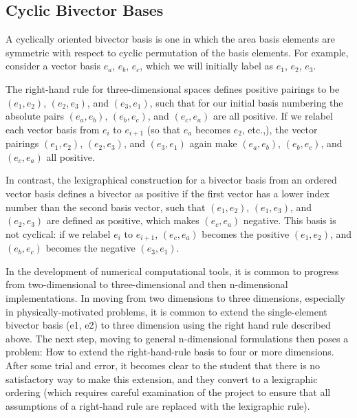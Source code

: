 \documentclass[11pt]{article}
\newcommand{\bv}[1][]{e_{#1}}
\newcommand{\bp}[2]{(#1,#2)}
\begin{document}
\subsection{Cyclic Bivector Bases}
\label{sec:cyclicbivector}


A cyclically oriented bivector basis is one in which the area basis elements are symmetric with respect to cyclic permutation of the basis elements. For example, consider a vector basis $\bv[a]$, $\bv[b]$, $\bv[c]$, which we will initially label as $\bv[1]$, $\bv[2]$, $\bv[3]$. 


The right-hand rule for three-dimensional spaces defines positive pairings to be $\bp{\bv[1]}{\bv[2]}$, $\bp{\bv[2]}{\bv[3]}$, and $\bp{\bv[3]}{\bv[1]}$, such that for our initial basis numbering the absolute pairs $\bp{\bv[a]}{\bv[b]}$, $\bp{\bv[b]}{\bv[c]}$, and $\bp{\bv[c]}{\bv[a]}$ are all positive. If we relabel each vector basis from $\bv[i]$ to $\bv[i+1]$ (so that $\bv[a]$ becomes $\bv[2]$, etc.,), the vector pairings $\bp{\bv[1]}{\bv[2]}$, $\bp{\bv[2]}{\bv[3]}$, and $\bp{\bv[3]}{\bv[1]}$ again make $\bp{\bv[a]}{\bv[b]}$, $\bp{\bv[b]}{\bv[c]}$, and $\bp{\bv[c]}{\bv[a]}$ all positive.



In contrast, the lexigraphical construction for a bivector basis from an ordered vector basis defines a bivector as positive if the first vector has a lower index number than the second basis vector, such that $\bp{\bv[1]}{\bv[2]}$, $\bp{\bv[1]}{\bv[3]}$, and $\bp{\bv[2]}{\bv[3]}$ are defined as positive, which makes $\bp{\bv[c]}{\bv[a]}$ negative. This basis is not cyclical: if we relabel $\bv[i]$ to $\bv[i+1]$, $\bp{\bv[c]}{\bv[a]}$ becomes the positive $\bp{\bv[1]}{\bv[2]}$, and $\bp{\bv[b]}{\bv[c]}$ becomes the negative $\bp{\bv[3]}{\bv[1]}$.




In the development of numerical computational tools, it is common to progress from two-dimensional to three-dimensional and then n-dimensional implementations. In moving from two dimensions to three dimensions, especially in physically-motivated problems, it is common to extend the single-element bivector basis (e1, e2) to three dimension using the right hand rule described above. The next step, moving to general n-dimensional formulations then poses a problem: How to extend the right-hand-rule basis to four or more dimensions. After some trial and error, it becomes clear to the student that there is no satisfactory way to make this extension, and they convert to a lexigraphic ordering (which requires careful examination of the project to ensure that all assumptions of a right-hand rule are replaced with the lexigraphic rule).
\end{document}
